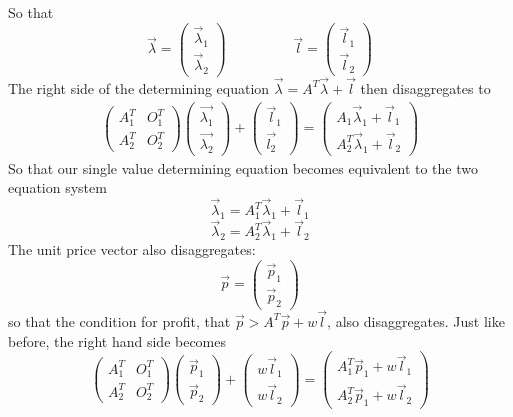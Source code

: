 \documentclass{article}
\theoremstyle{definition}
\theoremstyle{plain}
\theoremstyle{theorem}
\begin{document}
So that 
\[ \vec{\lambda} = \begin{pmatrix} \vec{\lambda}_1 \\ \vec{\lambda}_2 \end{pmatrix}  \hspace{2cm} \vec{l} = \begin{pmatrix} \vec{l}_1 \\ \vec{l}_2 \end{pmatrix} \]
The right side of the determining equation $\vec{\lambda} = A^T\vec{\lambda}+\vec{l}$ then disaggregates to
\begin{align*}
	\begin{pmatrix} A_1^T & O_1^T \\ A_2^T & O^T_2 \end{pmatrix} \begin{pmatrix} \vec{\lambda_1} \\ \vec{\lambda_2} \end{pmatrix} + \begin{pmatrix} \vec{l}_1 \\ \vec{l_2} \end{pmatrix} = \begin{pmatrix} A_1\vec{\lambda}_1 +\vec{l}_1 \\ A_2^T\vec{\lambda}_1 + \vec{l}_2 \end{pmatrix}
\end{align*} 
So that our single value determining equation becomes equivalent to the two equation system
\[ \vec{\lambda}_1 = A^T_1\vec{\lambda}_1+\vec{l}_1 \]
\[ \vec{\lambda}_2 = A^T_2\vec{\lambda}_1+\vec{l}_2 \]
The unit price vector also disaggregates:
\[ \vec{p} = \begin{pmatrix} \vec{p}_1 \\ \vec{p}_2 \end{pmatrix} \]
so that the condition for profit, that $\vec{p} > A^T\vec{p}+w\vec{l}$, also disaggregates. Just like before, the right hand side becomes
\[ \begin{pmatrix} A_1^T & O^T_1 \\ A_2^T & O^T_2  \end{pmatrix} \begin{pmatrix} \vec{p}_1 \\ \vec{p}_2 \end{pmatrix} + \begin{pmatrix} w\vec{l}_1 \\ w\vec{l}_2 \end{pmatrix} = \begin{pmatrix} A_1^T\vec{p}_1 + w\vec{l}_1 \\ A_2^T\vec{p}_1 + w\vec{l}_2 \end{pmatrix} \]
\end{document}
